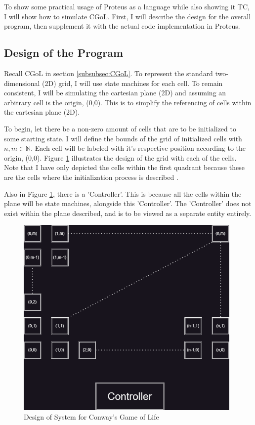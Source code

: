 To show some practical usage of Proteus as a language while also showing it TC, I will show how to simulate CGoL.
First, I will describe the design for the overall program, then supplement it with the actual code implementation in Proteus.

\subsection{Design of the Program}

Recall CGoL in section \ref{subsubsec:CGoL}.
To represent the standard two-dimensional (2D) grid, I will use state machines for each cell.
To remain consistent, I will be simulating the cartesian plane (2D) and assuming an arbitrary cell is the origin, (0,0).
This is to simplify the referencing of cells within the cartesian plane (2D).

To begin, let there be a non-zero amount of cells that are to be initialized to some starting state.
I will define the bounds of the grid of initialized cells with $n,m \in \mathbb{N}$.
Each cell will be labeled with it's respective position according to the origin, (0,0).
Figure \ref{fig:ProteusCGoLDesign} illustrates the design of the grid with each of the cells.
Note that I have only depicted the cells within the first quadrant because these are the cells where the initialization process is described \cite{CartesianPlane}.

Also in Figure \ref{fig:ProteusCGoLDesign}, there is a 'Controller'.
This is because all the cells within the plane will be state machines, alongside this 'Controller'.
The 'Controller' does not exist within the plane described, and is to be viewed as a separate entity entirely.

\begin{figure}[htb]
    \centering
    \includegraphics[width=11cm]{Images/CGoLDesign.png}
       \caption{Design of System for Conway's Game of Life}
           \label{fig:ProteusCGoLDesign}
\end{figure}

